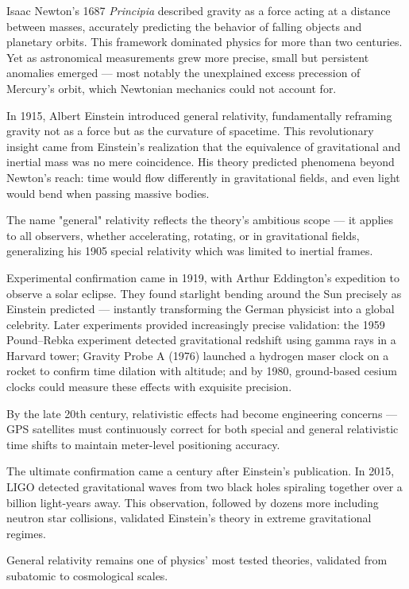 \begin{historical}
Isaac Newton's 1687 \textit{Principia} described gravity as a force acting at a distance between masses, accurately predicting the behavior of falling objects and planetary orbits. This framework dominated physics for more than two centuries. Yet as astronomical measurements grew more precise, small but persistent anomalies emerged — most notably the unexplained excess precession of Mercury's orbit, which Newtonian mechanics could not account for.

In 1915, Albert Einstein introduced general relativity, fundamentally reframing gravity not as a force but as the curvature of spacetime. This revolutionary insight came from Einstein's realization that the equivalence of gravitational and inertial mass was no mere coincidence. His theory predicted phenomena beyond Newton's reach: time would flow differently in gravitational fields, and even light would bend when passing massive bodies.

The name "general" relativity reflects the theory's ambitious scope — it applies to all observers, whether accelerating, rotating, or in gravitational fields, generalizing his 1905 special relativity which was limited to inertial frames.

Experimental confirmation came in 1919, with Arthur Eddington's expedition to observe a solar eclipse. They found starlight bending around the Sun precisely as Einstein predicted — instantly transforming the German physicist into a global celebrity. Later experiments provided increasingly precise validation: the 1959 Pound–Rebka experiment detected gravitational redshift using gamma rays in a Harvard tower; Gravity Probe A (1976) launched a hydrogen maser clock on a rocket to confirm time dilation with altitude; and by 1980, ground-based cesium clocks could measure these effects with exquisite precision.

By the late 20th century, relativistic effects had become engineering concerns — GPS satellites must continuously correct for both special and general relativistic time shifts to maintain meter-level positioning accuracy.

The ultimate confirmation came a century after Einstein's publication. In 2015, LIGO detected gravitational waves from two black holes spiraling together over a billion light-years away. This observation, followed by dozens more including neutron star collisions, validated Einstein's theory in extreme gravitational regimes.

General relativity remains one of physics' most tested theories, validated from subatomic to cosmological scales.
\end{historical}
